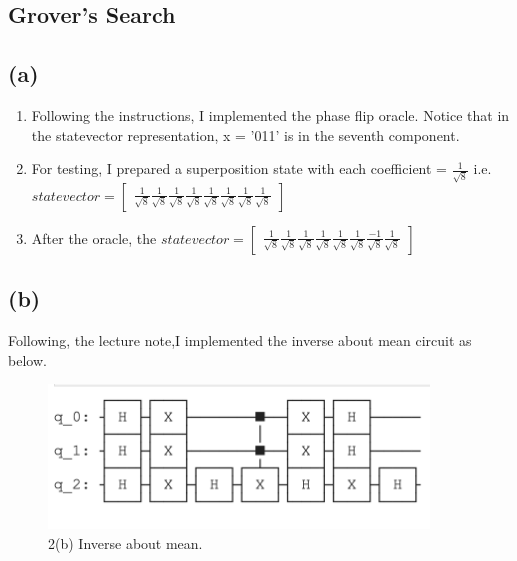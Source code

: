 \documentclass{article}
\begin{document}
\begin{CJK*}{UTF8}{bsmi}
\section{Grover's Search}
\subsection{(a)} 
\begin{enumerate}
    \item Following the instructions, I implemented the phase flip oracle. Notice that in the statevector representation, x = '011' is in the seventh component.  

    \item For testing, I prepared a superposition state with each coefficient = $\frac{1}{\sqrt{8}}$ i.e.  $statevector = \begin{bmatrix}
    \frac{1}{\sqrt{8}} \frac{1}{\sqrt{8}} \frac{1}{\sqrt{8}} \frac{1}{\sqrt{8}} \frac{1}{\sqrt{8}} \frac{1}{\sqrt{8}} \frac{1}{\sqrt{8}} \frac{1}{\sqrt{8}}
    \end{bmatrix}$
    
    \item After the oracle, the  $statevector = \begin{bmatrix}
    \frac{1}{\sqrt{8}} \frac{1}{\sqrt{8}} \frac{1}{\sqrt{8}} \frac{1}{\sqrt{8}} \frac{1}{\sqrt{8}} \frac{1}{\sqrt{8}} \frac{-1}{\sqrt{8}} \frac{1}{\sqrt{8}}
    \end{bmatrix}$
    
\end{enumerate}

\subsection{(b)}
Following, the lecture note,I implemented the inverse about mean circuit as below.
    \begin{figure}[h]
    \centering
    \includegraphics[width=0.9\textwidth]{2b.png}
    \caption{\label{fig:2b.png}2(b) Inverse about mean.}
    \end{figure}


\end{CJK*}
\end{document}
